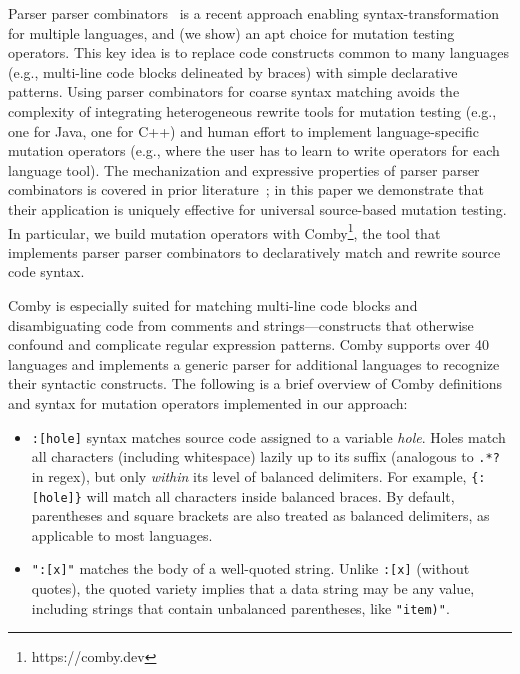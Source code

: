 \documentclass[acmsmall,screen,review,anonymous]{acmart}
\begin{document}
{Parser parser combinators~\cite{vanTonderPPC} is a recent approach enabling
syntax-transformation for multiple languages, and (we show) an apt choice for
mutation testing operators. This key idea is to replace code constructs
common to many languages (e.g., multi-line code blocks delineated by braces)
with simple declarative patterns. Using parser combinators for coarse syntax
matching avoids the complexity of integrating heterogeneous rewrite tools for
mutation testing (e.g., one for Java, one for C++) and human effort to
implement language-specific mutation operators (e.g., where the user has to
learn to write operators for each language tool). The mechanization and
expressive properties of parser parser combinators is covered in prior
literature~\cite{vanTonderPPC}; in this paper we demonstrate that their application is
uniquely effective for universal source-based mutation testing. In
particular, we
build mutation operators with Comby\footnote{https://comby.dev}, the tool that implements parser parser
combinators to declaratively match and rewrite source code syntax. 

Comby is especially suited for matching multi-line code blocks and
disambiguating code from comments and strings---constructs that otherwise
confound and complicate regular expression patterns. Comby supports over 40
languages and implements a generic parser for additional languages to recognize
their syntactic constructs. The following is a brief overview of Comby
definitions and syntax for mutation operators implemented in our approach:

\begin{itemize}

\item \texttt{\small:[hole]} syntax matches source code assigned to a variable \emph{hole}. Holes match all characters (including whitespace) lazily up to its suffix (analogous to \texttt{\small.*?} in regex), but only \emph{within} its level of balanced delimiters. For example, \texttt{\small\{:[hole]\}} will match all characters inside balanced braces. By default, parentheses and square brackets are also treated as balanced delimiters, as applicable to most languages. 

\item \texttt{\small ":[x]"} matches the body of a well-quoted string. Unlike \texttt{\small :[x]} (without quotes), the quoted variety implies that a data string may be any value, including strings that contain unbalanced parentheses, like \texttt{\small "item)"}.


\end{itemize}}
\end{document}
